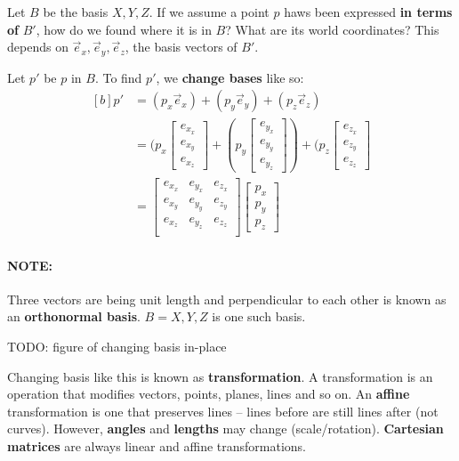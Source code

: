 \documentclass{article}
\begin{document}
Let $B$ be the basis $X,Y,Z$. If we assume a point $p$ haws been expressed \textbf{in terms of} $B'$, how do we found where it is in $B$? What are its world coordinates? This depends on $\vec{e}_x,\vec{e}_y,\vec{e}_z$, the basis vectors of $B'$.

Let $p'$ be $p$ in $B$. To find $p'$, we \textbf{change bases} like so:
\begin{equation}
\begin{aligned}[b]
	p' &= (p_x \vec{e}_x) + (p_y \vec{e}_y) + (p_z \vec{e}_z)  \\
	&= (p_x \left[ \begin{matrix} e_{x_x} \\ e_{x_y} \\ e_{x_z} \end{matrix} \right]
	+ (p_y\left[ \begin{matrix} e_{y_x} \\ e_{y_y} \\ e_{y_z} \end{matrix} \right])
	+ (p_z 	\left[ \begin{matrix} e_{z_x} \\ e_{z_y} \\ e_{z_z} \end{matrix} \right]  \\
	&= \left[ \begin{matrix}
		e_{x_x} & e_{y_x} & e_{z_x} \\
		e_{x_y} & e_{y_y} & e_{z_y} \\
		e_{x_z} & e_{y_z} & e_{z_z} \\
	\end{matrix} \right]
	\left[ \begin{matrix} p_x \\ p_y \\ p_z \end{matrix} \right]
\end{aligned}
\end{equation}

\paragraph{\textbf{NOTE: }} Three vectors are being unit length and perpendicular to each other is known as an \textbf{orthonormal basis}. $B = X,Y,Z$ is one such basis.

TODO: figure of changing basis in-place

Changing basis like this is known as \textbf{transformation}. A transformation is an operation that modifies vectors, points, planes, lines and so on. An \textbf{affine} transformation is one that preserves lines -- lines before are still lines after (not curves). However, \textbf{angles} and \textbf{lengths} may change (scale/rotation). \textbf{Cartesian matrices} are always linear and affine transformations.
\end{document}
